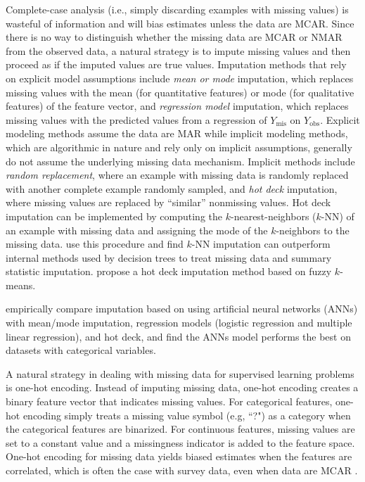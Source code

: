 \documentclass[10pt]{book}
\theoremstyle{definition}
\begin{document}
Complete-case analysis (i.e., simply discarding examples with missing values) is wasteful of information and will bias estimates unless the data are MCAR. Since there is no way to distinguish whether the missing data are MCAR or NMAR from the observed data, a natural strategy is to impute missing values and then proceed as if the imputed values are true values. Imputation methods that rely on explicit model assumptions include \emph{mean or mode} imputation, which replaces missing values with the mean (for quantitative features) or mode (for qualitative features) of the feature vector, and \emph{regression model} imputation, which replaces missing values with the predicted values from a regression of $Y_{\mathrm{mis}}$ on $Y_{\mathrm{obs}}$. Explicit modeling methods assume the data are MAR while implicit modeling methods, which are algorithmic in nature and rely only on implicit assumptions, generally do not assume the underlying missing data mechanism. Implicit methods include \emph{random replacement}, where an example with missing data is randomly replaced with another complete example randomly sampled, and \emph{hot deck} imputation, where missing values are replaced by ``similar'' nonmissing values. Hot deck imputation can be implemented by computing the $k$-nearest-neighbors ($k$-NN) of an example with missing data and assigning the mode of the $k$-neighbors to the missing data. \citep{batista2003analysis} use this procedure and find $k$-NN imputation can outperform internal methods used by decision trees to treat missing data and summary statistic imputation. \citep{li2004} propose a hot deck imputation method based on fuzzy $k$-means. 

\citep{silva2011} empirically compare imputation based on using artificial neural networks (ANNs) with mean/mode  imputation, regression models (logistic regression and multiple linear regression), and hot deck, and find the ANNs model performs the best on datasets with categorical variables. 


A natural strategy in dealing with missing data for supervised learning problems is one-hot encoding. Instead of imputing missing data, one-hot encoding creates a binary feature vector that indicates missing values. For categorical features, one-hot encoding simply treats a missing value symbol (e.g, ``?") as a category when the categorical features are binarized. For continuous features, missing values are set to a constant value and a missingness indicator is added to the feature space. One-hot encoding for missing data yields biased estimates when the features are correlated, which is often the case with survey data, even when data are MCAR \citep{jones1996}. 
\end{document}
